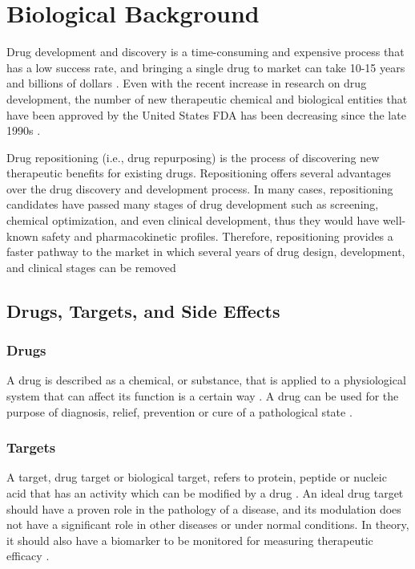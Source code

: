 \chapter{Biological Background}
\label{ch:biological}

Drug development and discovery is a time-consuming and expensive process that has a low success rate, and bringing a single drug to market can take 10-15 years and billions of dollars \cite{arrowsmith_phase_2011, arrowsmith_phase_2013}.
Even with the recent increase in research on drug development, the number of new therapeutic chemical and biological entities that have been approved by the United States \ac{FDA} has been decreasing since the late 1990s \cite{wang_exploring_2014}.

Drug repositioning (i.e., drug repurposing) is the process of discovering new therapeutic benefits for existing drugs.
Repositioning offers several advantages over the drug discovery and development process.
In many cases, repositioning candidates have passed many stages of drug development such as screening, chemical optimization, and even clinical development, thus they would have well-known safety and pharmacokinetic profiles.
Therefore, repositioning provides a faster pathway to the market in which several years of drug design, development, and clinical stages can be removed \cite{ashburn_drug_2004}

\section{Drugs, Targets, and Side Effects}

\subsection{Drugs}

A drug is described as a chemical, or substance, that is applied to a physiological system that can affect its function is a certain way \cite{rang_rang_2014}.
A drug can be used for the purpose of diagnosis, relief, prevention or cure of a pathological state \cite{satoskar_pharmacology_1973}.

\subsection{Targets}

A target, drug target or biological target, refers to protein, peptide or nucleic acid that has an activity which can be modified by a drug \cite{gashaw_what_2011}.
An ideal drug target should have a proven role in the pathology of a disease, and its modulation does not have a significant role in other diseases or under normal conditions.
In theory, it should also have a biomarker to be monitored for measuring therapeutic efficacy \cite{gashaw_what_2011}.

